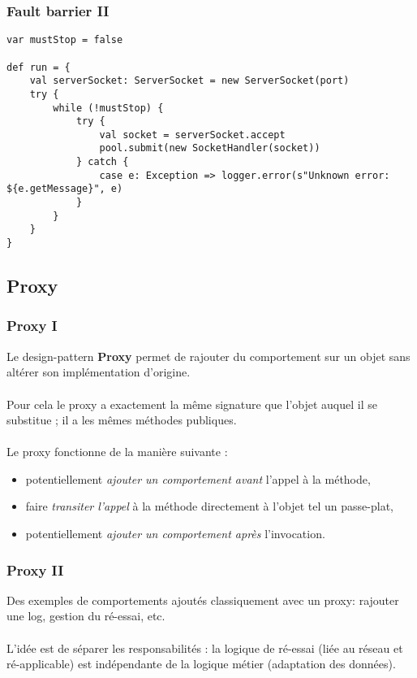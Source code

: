 \begin{frame}[fragile]
	\frametitle{Fault barrier II}

	\begin{lstlisting}
var mustStop = false

def run = {
	val serverSocket: ServerSocket = new ServerSocket(port)
	try {
		while (!mustStop) {
        	try {
        		val socket = serverSocket.accept
        		pool.submit(new SocketHandler(socket))
        	} catch {
        		case e: Exception => logger.error(s"Unknown error: ${e.getMessage}", e)
        	}
		}
	}
}
	\end{lstlisting}
\end{frame}

\subsection{Proxy}

\begin{frame}[fragile]
	\frametitle{Proxy I}
Le design-pattern \textbf{Proxy} permet de rajouter du comportement sur un objet sans alt\'{e}rer son impl\'{e}mentation d'origine.
\\~\\
Pour cela le proxy a exactement la m\^{e}me signature que l'objet auquel il se substitue ; il a les m\^{e}mes m\'{e}thodes publiques.
\\~\\
Le proxy fonctionne de la mani\`{e}re suivante :

		\begin{itemize}
			\item potentiellement \textit{ajouter un comportement avant} l'appel \`{a} la m\'{e}thode, 
			\item faire \textit{transiter l'appel} \`{a} la m\'{e}thode directement \`{a} l'objet tel un passe-plat, 
			\item potentiellement \textit{ajouter un comportement apr\`{e}s} l'invocation.
		\end{itemize}
\end{frame}

\begin{frame}[fragile]
	\frametitle{Proxy II}
Des exemples de comportements ajout\'{e}s classiquement avec un proxy: rajouter une log, gestion du r\'{e}-essai, etc.
\\~\\
L'id\'{e}e est de s\'{e}parer les responsabilit\'{e}s : la logique de r\'{e}-essai (li\'{e}e au r\'{e}seau et r\'{e}-applicable) est ind\'{e}pendante de la logique m\'{e}tier (adaptation des donn\'{e}es).
\end{frame}

